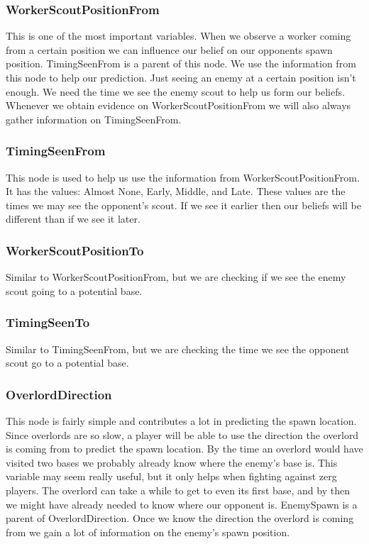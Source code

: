 \subsubsection*{WorkerScoutPositionFrom} This is one of the most important variables. When we observe a worker coming from a certain position we can influence our belief on our opponents spawn position. TimingSeenFrom is a parent of this node. We use the information from this node to help our prediction. Just seeing an enemy at a certain position isn't enough. We need the time we see the enemy scout to help us form our beliefs. Whenever we obtain evidence on WorkerScoutPositionFrom we will also always gather information on TimingSeenFrom.

\subsubsection*{TimingSeenFrom} This node is used to help us use the information from WorkerScoutPositionFrom. It has the values: Almost None, Early, Middle, and Late. These values are the times we may see the opponent's scout. If we see it earlier then our beliefs will be different than if we see it later.

\subsubsection*{WorkerScoutPositionTo} Similar to WorkerScoutPositionFrom, but we are checking if we see the enemy scout going to a potential base.

\subsubsection*{TimingSeenTo} Similar to TimingSeenFrom, but we are checking the time we see the opponent scout go to a potential base.

\subsubsection*{OverlordDirection} This node is fairly simple and contributes a lot in predicting the spawn location. Since overlords are so slow, a player will be able to use the direction the overlord is coming from to predict the spawn location. By the time an overlord would have visited two bases we probably already know where the enemy's base is. This variable may seem really useful, but it only helps when fighting against zerg players. The overlord can take a while to get to even its first base, and by then we might have already needed to know where our opponent is. EnemySpawn is a parent of OverlordDirection. Once we know the direction the overlord is coming from we gain a lot of information on the enemy's spawn position.

